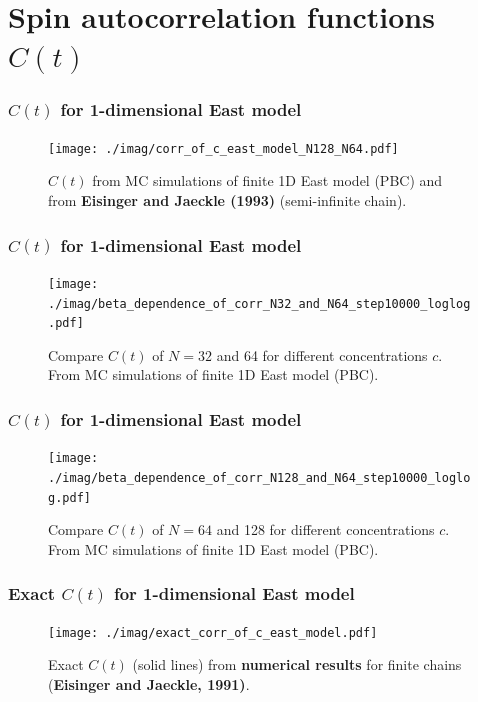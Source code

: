\documentclass[8pt]{beamer}
\begin{document}
\section{Spin autocorrelation functions $C(t)$}
\begin{frame}
	\frametitle{$C(t)$ for 1-dimensional East model}
	\begin{figure}
		\centering
		\texttt{[image: ./imag/corr\_of\_c\_east\_model\_N128\_N64.pdf]}
		\setlength{\abovecaptionskip}{0pt}
		\caption{$C(t)$ from MC simulations of finite 1D East model (PBC) and from \textbf{Eisinger and Jaeckle (1993)} (semi-infinite chain). }
	\end{figure}
\end{frame}

\begin{frame}
	\frametitle{$C(t)$ for 1-dimensional East model}
	\begin{figure}
		\centering
		\texttt{[image: ./imag/beta\_dependence\_of\_corr\_N32\_and\_N64\_step10000\_loglog.pdf]}
		\setlength{\abovecaptionskip}{0pt}
		\caption{Compare $C(t)$ of $N=32$ and 64 for different concentrations $c$. From MC simulations of finite 1D East model (PBC).}
	\end{figure}
\end{frame}

\begin{frame}
	\frametitle{$C(t)$ for 1-dimensional East model}
	\begin{figure}
		\centering
		\texttt{[image: ./imag/beta\_dependence\_of\_corr\_N128\_and\_N64\_step10000\_loglog.pdf]}
		\setlength{\abovecaptionskip}{0pt}
		\caption{Compare $C(t)$ of $N=64$ and 128 for different concentrations $c$. From MC simulations of finite 1D East model (PBC).}
	\end{figure}
\end{frame}

\begin{frame}
	\frametitle{Exact  $C(t)$ for 1-dimensional East model}
	\begin{figure}
		\centering
		\texttt{[image: ./imag/exact\_corr\_of\_c\_east\_model.pdf]}
		\setlength{\abovecaptionskip}{0pt}
		\caption{Exact $C(t)$ (solid lines) from \textbf{numerical results} for finite chains (\textbf{Eisinger and Jaeckle, 1991)}.}
	\end{figure}
\end{frame}
\end{document}
